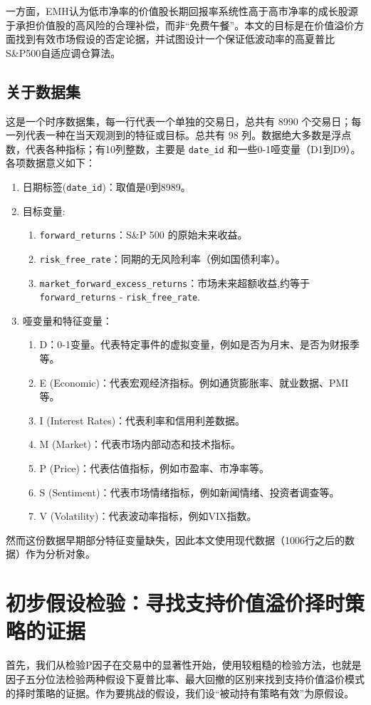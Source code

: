 \documentclass[11pt, a4paper]{article}
\begin{document}
一方面，EMH认为低市净率的价值股长期回报率系统性高于高市净率的成长股源于承担价值股的高风险的合理补偿，而非“免费午餐”。本文的目标是在价值溢价方面找到有效市场假设的否定论据，并试图设计一个保证低波动率的高夏普比S\&P500自适应调仓算法。
\subsection{关于数据集}
这是一个时序数据集，每一行代表一个单独的交易日，总共有 8990 个交易日；每一列代表一种在当天观测到的特征或目标。总共有 98 列。数据绝大多数是浮点数，代表各种指标；有10列整数，主要是 \texttt{date\_id} 和一些0-1哑变量（D1到D9）。各项数据意义如下：
\begin{enumerate}
    \item 日期标签(\texttt{date\_id})：取值是0到8989。
    \item 目标变量:
    \begin{enumerate}
        \item \texttt{forward\_returns}：S\&P 500 的原始未来收益。
        \item \texttt{risk\_free\_rate}：同期的无风险利率（例如国债利率）。
        \item \texttt{market\_forward\_excess\_returns}：市场未来超额收益,约等于 \texttt{forward\_returns} - \texttt{risk\_free\_rate}.
    \end{enumerate}
    \item 哑变量和特征变量：\begin{enumerate}
        \item D：0-1变量。代表特定事件的虚拟变量，例如是否为月末、是否为财报季等。
        \item E (Economic)：代表宏观经济指标。例如通货膨胀率、就业数据、PMI等。
        \item I (Interest Rates)：代表利率和信用利差数据。
        \item M (Market)：代表市场内部动态和技术指标。
        \item P (Price)：代表估值指标，例如市盈率、市净率等。
        \item S (Sentiment)：代表市场情绪指标，例如新闻情绪、投资者调查等。
        \item V (Volatility)：代表波动率指标，例如VIX指数。
    \end{enumerate}
\end{enumerate}
然而这份数据早期部分特征变量缺失，因此本文使用现代数据（1006行之后的数据）作为分析对象。
\section{初步假设检验：寻找支持价值溢价择时策略的证据}
首先，我们从检验P因子在交易中的显著性开始，使用较粗糙的检验方法，也就是因子五分位法检验两种假设下夏普比率、最大回撤的区别来找到支持价值溢价模式的择时策略的证据\cite{fama1993common}。作为要挑战的假设，我们设“被动持有策略有效”为原假设。
\end{document}
